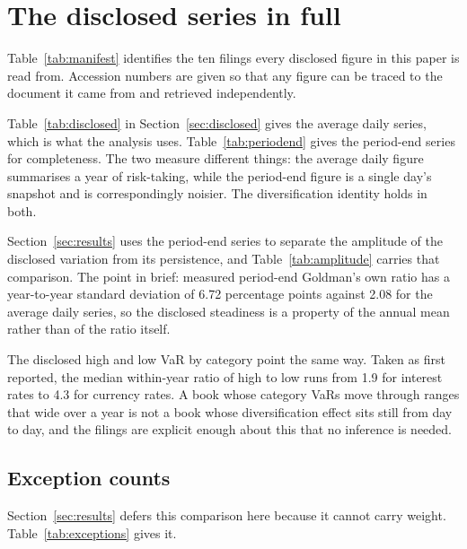 
\section{The disclosed series in full}\label{sec:appendix_a}

Table~\ref{tab:manifest} identifies the ten filings every disclosed figure in
this paper is read from. Accession numbers are given so that any figure can be
traced to the document it came from and retrieved independently.



Table~\ref{tab:disclosed} in Section~\ref{sec:disclosed} gives the average
daily series, which is what the analysis uses. Table~\ref{tab:periodend} gives
the period-end series for completeness. The two measure different things: the
average daily figure summarises a year of risk-taking, while the period-end
figure is a single day's snapshot and is correspondingly noisier. The
diversification identity holds in both.



Section~\ref{sec:results} uses the period-end series to separate the amplitude
of the disclosed variation from its persistence, and Table~\ref{tab:amplitude}
carries that comparison. The point in brief: measured period-end Goldman's own
ratio has a year-to-year standard deviation of 6.72 percentage points against
2.08 for the average daily series, so the disclosed steadiness is a property of
the annual mean rather than of the ratio itself.

The disclosed high and low VaR by category point the same way. Taken as first
reported, the median within-year ratio of high to low runs from 1.9 for
interest rates to 4.3 for currency rates. A book whose category VaRs move
through ranges that wide over a year is not a book whose diversification effect
sits still from day to day, and the filings are explicit enough about this that
no inference is needed.

\subsection*{Exception counts}

Section~\ref{sec:results} defers this comparison here because it cannot carry
weight. Table~\ref{tab:exceptions} gives it.


